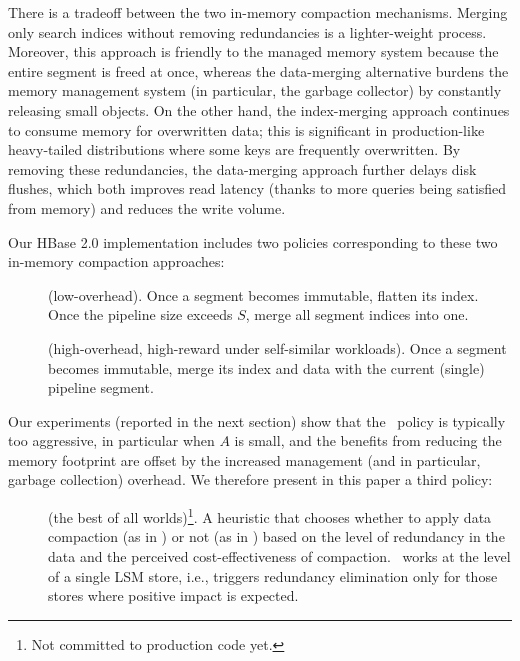 There is a tradeoff between the two in-memory compaction mechanisms. Merging only search indices without removing redundancies is a lighter-weight process.  Moreover, this approach is friendly to the managed memory system because the entire segment is freed at once, whereas 
the data-merging alternative burdens the memory management system (in particular, the garbage collector) by
constantly releasing small objects. On the other hand, the index-merging approach  continues to 
consume memory for overwritten data; this is significant in production-like heavy-tailed distributions where some keys are frequently overwritten.
By removing these redundancies, the data-merging approach further delays disk flushes, which both improves read latency  (thanks to more 
queries being satisfied from memory) and reduces the write volume.

Our HBase 2.0 implementation includes two policies corresponding to these two in-memory compaction approaches:
\begin{description}
\item[\basic] (low-overhead). Once a segment becomes immutable, flatten its index. Once the pipeline size exceeds $S$, 
merge all segment indices into one.  
\item[\eager] (high-overhead, high-reward under self-similar workloads). 
Once a segment becomes immutable, merge its index and data with the current (single) pipeline segment.
\end{description}

Our experiments (reported in the next section) show that the \eager\ policy is typically too aggressive, in particular when $A$ is small,
and the benefits from reducing the memory footprint are offset by the increased management (and in particular, garbage collection) overhead.
We therefore present in this paper a third policy:
\begin{description}
\item[\adp] (the best of all worlds)\footnote{\small{Not committed to production code yet.}}. A heuristic that chooses 
whether to apply data compaction (as in \eager) or not (as in \basic) based on the level of redundancy in the data 
and the perceived cost-effectiveness of compaction. \adp\ works at the level of a single LSM store, i.e., triggers 
redundancy elimination only for those stores where positive impact is expected. 
\end{description}

